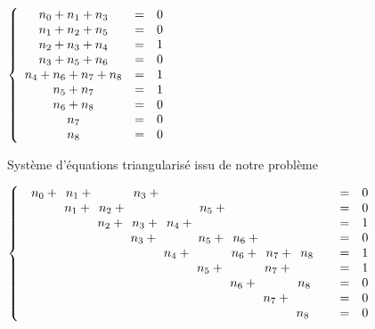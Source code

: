 \documentclass[10pt,a2paper]{article}
\begin{document}
\vspace{2em}$\left\{\begin{array}{c c l}n_{0} +n_{1} +n_{3} &=& 0\\n_{1} +n_{2} +n_{5} &=& 0\\n_{2} +n_{3} +n_{4} &=& 1\\n_{3} +n_{5} +n_{6} &=& 0\\n_{4} +n_{6} +n_{7} +n_{8} &=& 1\\n_{5} +n_{7} &=& 1\\n_{6} +n_{8} &=& 0\\n_{7} &=& 0\\n_{8} &=& 0\\\end{array}\right.$\newpage\begin{LARGE}Système d'équations triangularisé issu de notre problème\end{LARGE}

\vspace{2em}$\left\{\begin{array}{l c l}\phantom{0}n_{0} +\phantom{0}n_{1} +\phantom{ 0n_{2} +\ } \phantom{0}n_{3} +\phantom{ 0n_{4} +\ } \phantom{ 0n_{5} +\ } \phantom{ 0n_{6} +\ } \phantom{ 0n_{7} +\ } \phantom{ 0n_{8} +\ }&=& 0\\\phantom{ 0n_{0} +\ } \phantom{0}n_{1} +\phantom{0}n_{2} +\phantom{ 0n_{3} +\ } \phantom{ 0n_{4} +\ } \phantom{0}n_{5} +\phantom{ 0n_{6} +\ } \phantom{ 0n_{7} +\ } \phantom{ 0n_{8} +\ }&=& 0\\\phantom{ 0n_{0} +\ } \phantom{ 0n_{1} +\ } \phantom{0}n_{2} +\phantom{0}n_{3} +\phantom{0}n_{4} +\phantom{ 0n_{5} +\ } \phantom{ 0n_{6} +\ } \phantom{ 0n_{7} +\ } \phantom{ 0n_{8} +\ }&=& 1\\\phantom{ 0n_{0} +\ } \phantom{ 0n_{1} +\ } \phantom{ 0n_{2} +\ } \phantom{0}n_{3} +\phantom{ 0n_{4} +\ } \phantom{0}n_{5} +\phantom{0}n_{6} +\phantom{ 0n_{7} +\ } \phantom{ 0n_{8} +\ }&=& 0\\\phantom{ 0n_{0} +\ } \phantom{ 0n_{1} +\ } \phantom{ 0n_{2} +\ } \phantom{ 0n_{3} +\ } \phantom{0}n_{4} +\phantom{ 0n_{5} +\ } \phantom{0}n_{6} +\phantom{0}n_{7} +\phantom{0}n_{8} &=& 1\\\phantom{ 0n_{0} +\ } \phantom{ 0n_{1} +\ } \phantom{ 0n_{2} +\ } \phantom{ 0n_{3} +\ } \phantom{ 0n_{4} +\ } \phantom{0}n_{5} +\phantom{ 0n_{6} +\ } \phantom{0}n_{7} +\phantom{ 0n_{8} +\ }&=& 1\\\phantom{ 0n_{0} +\ } \phantom{ 0n_{1} +\ } \phantom{ 0n_{2} +\ } \phantom{ 0n_{3} +\ } \phantom{ 0n_{4} +\ } \phantom{ 0n_{5} +\ } \phantom{0}n_{6} +\phantom{ 0n_{7} +\ } \phantom{0}n_{8} &=& 0\\\phantom{ 0n_{0} +\ } \phantom{ 0n_{1} +\ } \phantom{ 0n_{2} +\ } \phantom{ 0n_{3} +\ } \phantom{ 0n_{4} +\ } \phantom{ 0n_{5} +\ } \phantom{ 0n_{6} +\ } \phantom{0}n_{7} +\phantom{ 0n_{8} +\ }&=& 0\\\phantom{ 0n_{0} +\ } \phantom{ 0n_{1} +\ } \phantom{ 0n_{2} +\ } \phantom{ 0n_{3} +\ } \phantom{ 0n_{4} +\ } \phantom{ 0n_{5} +\ } \phantom{ 0n_{6} +\ } \phantom{ 0n_{7} +\ } \phantom{0}n_{8} &=& 0\\\end{array}\right.$
\end{document}
